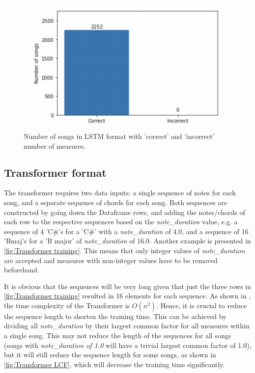 \begin{figure}
    \centering
    \includegraphics{Figures/LSTM check}
    \decoRule
    \caption{Number of songs in LSTM format with 'correct' and 'incorrect' number of measures.}
    \label{fig:LSTM check}
    \end{figure}

\subsection{Transformer format}
\label{Transformer format for training}
The transformer requires two data inputs: a single sequence of notes for each song, and a separate sequence of chords for each song. Both sequences are constructed by going down the Dataframe rows, and adding the notes/chords of each row to the respective sequences based on the \emph{note\_duration} value, e.g. a sequence of 4 'C\#'s for a 'C\#' with a \emph{note\_duration} of 4.0, and a sequence of 16 'Bmaj's for a 'B major' of \emph{note\_duration} of 16.0. Another example is presented in \cref{fig:Transformer training}. This means that only integer values of \emph{note\_duration} are accepted and measures with non-integer values have to be removed beforehand.

It is obvious that the sequences will be very long given that just the three rows in \cref{fig:Transformer training} resulted in 16 elements for each sequence. As shown in \cite{StanfordTransformer}, the time complexity of the Transformer is $O({n}^2)$. Hence, it is crucial to reduce the sequence length to shorten the training time. This can be achieved by dividing all \emph{note\_duration} by their largest common factor for all measures within a single song. This may not reduce the length of the sequences for all songs (songs with \emph{note\_duration of 1.0} will have a trivial largest common factor of 1.0), but it will still reduce the sequence length for some songs, as shown in \cref{fig:Transformer LCF}, which will decrease the training time significantly.


